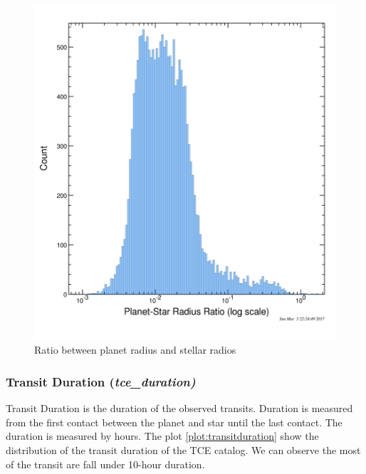 \begin{figure}[!h]
\begin{center}
        \includegraphics[width=0.5\textheight]{img/planet_star_radius_ratio.png}
        \caption{Ratio between planet radius and stellar radios}  \label{plot:planet_star_radius_ratio}
\end{center}
\end{figure}

\subsubsection{Transit Duration (\emph{tce\_duration)}}
Transit Duration is the duration of the observed transits. Duration is measured from the first contact between the planet and star until the last contact. The duration is measured by hours. The plot \ref{plot:transitduration} show the distribution of the transit duration of the TCE catalog. We can observe the most of the transit are fall under 10-hour duration.

